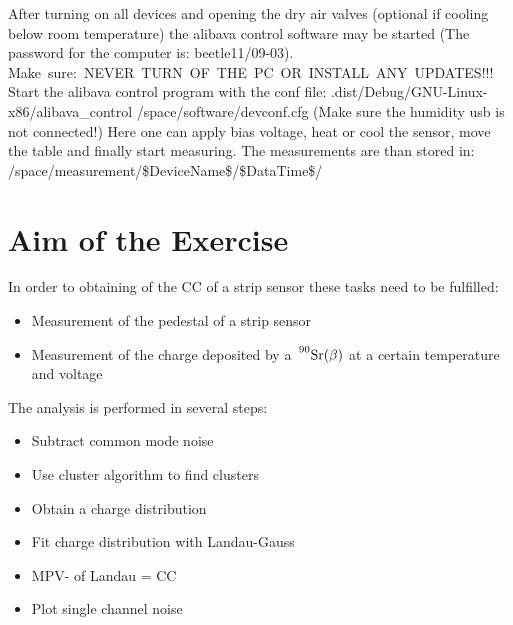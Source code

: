 \documentclass{article}
\begin{document}
After turning on all devices and opening the dry air valves (optional if cooling below room temperature) the alibava control software may be started (The password for the computer is: beetle11/09-03).
\newline
\mbox{Make sure: NEVER TURN OF THE PC OR INSTALL ANY UPDATES!!!}
\newline
Start the alibava control program with the conf file:
\newline
 .dist/Debug/GNU-Linux-x86/alibava\_control /space/software/devconf.cfg
\newline
(Make sure the humidity usb is not connected!)
Here one can apply bias voltage, heat or cool the sensor, move the table and finally start measuring.
The measurements are than stored in:
\newline
 /space/measurement/\$DeviceName\$/\$DataTime\$/
\newline
\section{Aim of the Exercise}
In order to obtaining of the CC of a strip sensor these tasks need to be fulfilled:
\begin{itemize}
  \item Measurement of the pedestal of a strip sensor
  \item Measurement of the charge deposited by a $\sideset{^{90}}{}{\mathop{\mathrm{Sr}(\beta)}}$ at a certain temperature and voltage
\end{itemize}
The analysis is performed in several steps:
\begin{itemize}
  \item Subtract common mode noise
  \item Use cluster algorithm to find clusters
  \item Obtain a charge distribution
  \item Fit charge distribution with Landau-Gauss
  \item MPV- of Landau = CC
  \item Plot single channel noise
\end{itemize}
\end{document}
